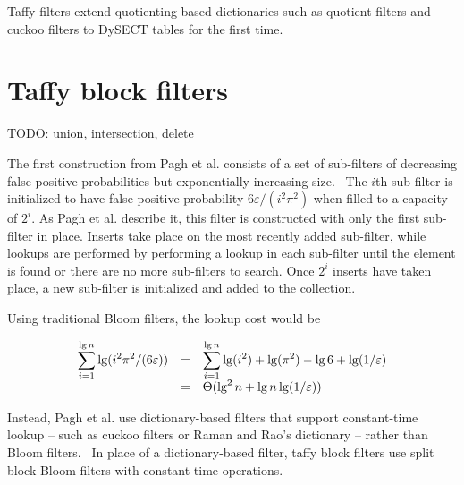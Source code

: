\documentclass[sigconf, nonacm]{acmart}
\newcommand{\etal}{et al.}
\begin{document}
Taffy filters extend quotienting-based dictionaries such as quotient filters and cuckoo filters to DySECT tables for the first time.

\section{Taffy block filters}
\label{pbf}

TODO: union, intersection, delete

The first construction from Pagh \etal{} consists of a set of sub-filters of decreasing false positive probabilities but exponentially increasing size.~\cite{psw}
The $i$th sub-filter is initialized to have false positive probability $6 \varepsilon/(i^2 \pi^2)$ when filled to a capacity of $2^i$.
As Pagh \etal{} describe it, this filter is constructed with only the first sub-filter in place.
Inserts take place on the most recently added sub-filter, while lookups are performed by performing a lookup in each sub-filter until the element is found or there are no more sub-filters to search.
Once $2^i$ inserts have taken place, a new sub-filter is initialized and added to the collection.

Using traditional Bloom filters, the lookup cost would be

\[
\begin{array}{r c l}
\displaystyle\sum_{i=1}^{\lg n} \lg (i^2 \pi^2 /(6 \varepsilon)) & = &
 \displaystyle\sum_{i=1}^{\lg n} \lg (i^2) + \lg( \pi^2) - \lg 6 + \lg (1/\varepsilon) \\
& = & \Theta(\lg^2 n + \lg n \lg (1/\varepsilon))
\end{array}
\]

Instead, Pagh \etal{} use dictionary-based filters that support constant-time lookup -- such as cuckoo filters or Raman and Rao's dictionary -- rather than Bloom filters.~\cite{succinct,psw}
In place of a dictionary-based filter, taffy block filters use split block Bloom filters with constant-time operations.~\cite{block-bloom,ultra-fast,cuckoo-filter-github}

\end{document}
